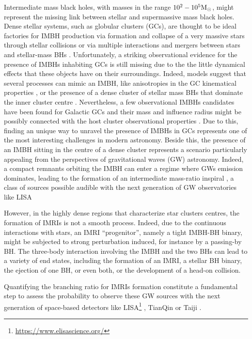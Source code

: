 \documentclass[useAMS,usenatbib]{mn2e}
\newcommand{\Ms}{{\rm M}_\odot}
\begin{document}
Intermediate mass black holes, with masses in the range $10^2-10^5\Ms$, might
represent the missing link between stellar and supermassive mass black holes.
Dense stellar systems, such as globular clusters (GCs), are thought to be ideal
factories for IMBH production via formation and collapse of a very massive
stars through stellar collisions \citep{zwart02, giersz15, mapelli16} or via
multiple interactions and mergers between stars and stellar-mass BHs
\citep{giersz15}. Unfortunately, a striking observational evidence for the
presence of IMBHs inhabiting GCs is still missing due to the the little
dynamical effects that these objects have on their surroundings. Indeed, models
suggest that several processes can mimic an IMBH, like anisotropies in the GC
kinematical properties \citep{zocchi}, or the presence of a dense cluster of
stellar mass BHs that dominate the inner cluster centre
\citep{AAG18a,AAG18b,AS16,vandermarel10}. Nevertheless, a few observational
IMBHs candidates have been found for Galactic GCs
\citep{noyola10,lu13,lanzoni13,kiziltan17} and their mass and influence radius
might be possibly connected with the host cluster observational properties
\citep{AAG18a}. Due to this, finding an unique way to unravel the presence of
IMBHs in GCs represents one of the most interesting challenges in modern
astronomy. Beside this, the presence of an IMBH sitting in the centre of a
dense cluster represents a scenario particularly appealing from the
perspectives of gravitational waves (GW) astronomy. Indeed, a compact remnants
orbiting the IMBH can enter a regime where GWs emission dominates, leading to
the formation of an intermediate mass-ratio inspiral
\citep[IMRI,][]{konstantinidis13,haster16,leigh14}, a class of sources possible
audible with the next generation of GW observatories like LISA
\citep{seoane07,amaro12,seoane18}

However, in the highly dense regions that characterize star clusters centres,
the formation of IMRIs is not a smooth process. Indeed, due to the continuous
interactions with stars, an IMRI ``progenitor'', namely a tight IMBH-BH binary,
might be subjected to strong perturbation induced, for instance by a passing-by
BH. The three-body interaction involving the IMBH and the two BHs can lead to a
variety of end states, including the formation of an IMRI, a stellar BH binary,
the ejection of one BH, or even both, or the development of a head-on
collision. 

Quantifying the branching ratio for IMRIs formation constitute a fundamental
step to assess the probability to observe these GW sources with the next
generation of space-based detectors like
LISA\footnote{\url{https://www.elisascience.org/}} \citep{seoane07}, TianQin
\citep{tianqin16} or Taiji \citep{taiji17}.
\end{document}
